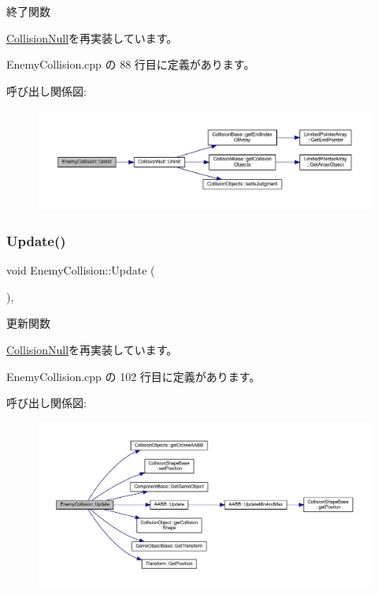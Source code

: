 終了関数 



\mbox{\hyperlink{class_collision_null_a7c6d0ec502efc55e2f406415451152f5}{Collision\+Null}}を再実装しています。



 Enemy\+Collision.\+cpp の 88 行目に定義があります。

呼び出し関係図\+:\nopagebreak
\begin{figure}[H]
\begin{center}
\leavevmode
\includegraphics[width=350pt]{class_enemy_collision_a2a194c606fd162db803c70c6fed9b9e4_cgraph}
\end{center}
\end{figure}
\mbox{\label{class_enemy_collision_ab54133504d867c6d2070d2f3854a0aaf}} 
\subsubsection{\texorpdfstring{Update()}{Update()}}
{\footnotesize\ttfamily void Enemy\+Collision\+::\+Update (\begin{DoxyParamCaption}{ }\end{DoxyParamCaption})\hspace{0.3cm}{\ttfamily [override]}, {\ttfamily [virtual]}}



更新関数 



\mbox{\hyperlink{class_collision_null_a5e5e094e3fbe3ccc0515e485c739bd15}{Collision\+Null}}を再実装しています。



 Enemy\+Collision.\+cpp の 102 行目に定義があります。

呼び出し関係図\+:\nopagebreak
\begin{figure}[H]
\begin{center}
\leavevmode
\includegraphics[width=350pt]{class_enemy_collision_ab54133504d867c6d2070d2f3854a0aaf_cgraph}
\end{center}
\end{figure}


